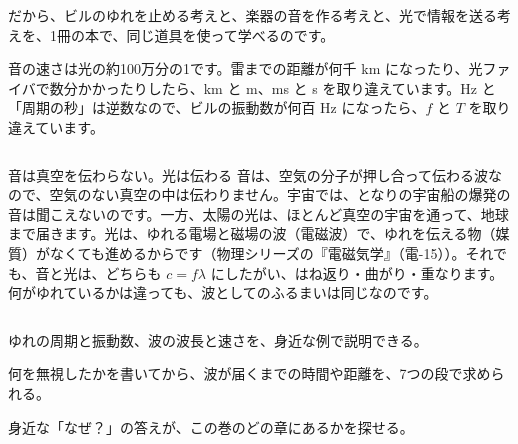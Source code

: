 だから、ビルのゆれを止める考えと、楽器の音を作る考えと、光で情報を送る考えを、1冊の本で、同じ道具を使って学べるのです。
\begin{phketa}[ゆれと波の数]
音の速さは光の約100万分の1です。雷までの距離が何千 km になったり、光ファイバで数分かかったりしたら、km と m、ms と s を取り違えています。Hz と「周期の秒」は逆数なので、ビルの振動数が何百 Hz になったら、$f$ と $T$ を取り違えています。
\end{phketa}



\begin{column}{音は真空を伝わらない。光は伝わる}
音は、空気の分子が押し合って伝わる波なので、空気のない真空の中は伝わりません。宇宙では、となりの宇宙船の爆発の音は聞こえないのです。一方、太陽の光は、ほとんど真空の宇宙を通って、地球まで届きます。光は、ゆれる電場と磁場の波（電磁波）で、ゆれを伝える物（媒質）がなくても進めるからです（物理シリーズの『電磁気学』（電-15））。それでも、音と光は、どちらも $c=f\lambda$ にしたがい、はね返り・曲がり・重なります。何がゆれているかは違っても、波としてのふるまいは同じなのです。
\end{column}

\begin{kotoba}\small
{}
\end{kotoba}

\begin{furikaeri}
\begin{checklist}
\item ゆれの周期と振動数、波の波長と速さを、身近な例で説明できる。
\item 何を無視したかを書いてから、波が届くまでの時間や距離を、7つの段で求められる。
\item 身近な「なぜ？」の答えが、この巻のどの章にあるかを探せる。
\end{checklist}
\end{furikaeri}
